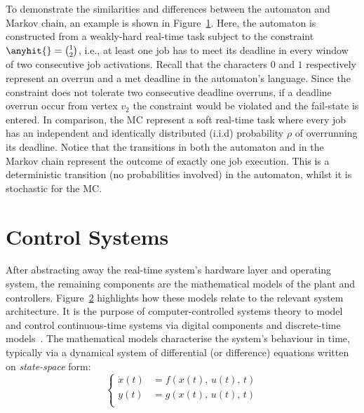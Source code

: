 \begin{figure}[t]
    \centering
    
    \caption{}
    \label{fig:kappa:state-machine}
\end{figure}
%
To demonstrate the similarities and differences between the automaton and Markov chain, an example is shown in Figure~\ref{fig:kappa:state-machine}.
Here, the automaton is constructed from a weakly-hard real-time task subject to the constraint $\anyhit{} = \binom{1}{2}$, i.e., at least one job has to meet its deadline in every window of two consecutive job activations.
Recall that the characters $0$ and $1$ respectively represent an overrun and a met deadline in the automaton's language.
Since the constraint does not tolerate two consecutive deadline overruns, if a deadline overrun occur from vertex $v_2$ the constraint would be violated and the fail-state is entered.
In comparison, the MC represent a soft real-time task where every job has an independent and identically distributed (i.i.d) probability $\rho$ of overrunning its deadline.
Notice that the transitions in both the automaton and in the Markov chain represent the outcome of exactly one job execution.
This is a deterministic transition (no probabilities involved) in the automaton, whilst it is stochastic for the MC.



\section{Control Systems}%
\label{sec:background:ctrl}%
%
\begin{figure}[t]
    \centering
    
    \caption{}
    \label{fig:control-structure-abstraction}
\end{figure}
%
After abstracting away the real-time system's hardware layer and operating system, the remaining components are the mathematical models of the plant and controllers.
Figure~\ref{fig:control-structure-abstraction} highlights how these models relate to the relevant system architecture.
It is the purpose of computer-controlled systems theory to model and control continuous-time systems via digital components and discrete-time models~\cite{Astrom:1997}.
The mathematical models characterise the system's behaviour in time, typically via a dynamical system of differential (or difference) equations written on \emph{state-space} form:
%
\begin{equation}%
    \label{eq:state-space}%
    \left\{\begin{aligned}
        \dot{x}(t) &= f(x(t),\, u(t),\, t) \\
        y(t) &= g(x(t),\, u(t),\, t) \\
    \end{aligned}\right.
\end{equation}

